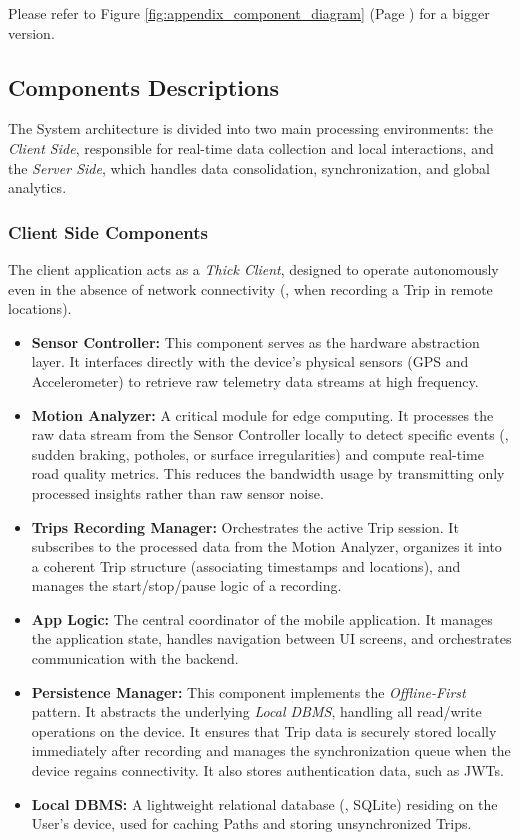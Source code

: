 Please refer to Figure \ref{fig:appendix_component_diagram} (Page \pageref{fig:appendix_component_diagram}) for a bigger version.
\subsection{Components Descriptions}
The System architecture is divided into two main processing environments: the \emph{Client Side}, responsible for real-time data collection and local interactions, and the \emph{Server Side}, which handles data consolidation, synchronization, and global analytics.

\subsubsection*{Client Side Components}
The client application acts as a \emph{Thick Client}, designed to operate autonomously even in the absence of network connectivity (\eg, when recording a Trip in remote locations).
\begin{itemize}
    \item \textbf{Sensor Controller:} This component serves as the hardware abstraction layer. It interfaces directly with the device's physical sensors (GPS and Accelerometer) to retrieve raw telemetry data streams at high frequency.
    
    \item \textbf{Motion Analyzer:} A critical module for edge computing. It processes the raw data stream from the Sensor Controller locally to detect specific events (\eg, sudden braking, potholes, or surface irregularities) and compute real-time road quality metrics. This reduces the bandwidth usage by transmitting only processed insights rather than raw sensor noise.
    
    \item \textbf{Trips Recording Manager:} Orchestrates the active Trip session. It subscribes to the processed data from the Motion Analyzer, organizes it into a coherent Trip structure (associating timestamps and locations), and manages the start/stop/pause logic of a recording.
    
    \item \textbf{App Logic:} The central coordinator of the mobile application. It manages the application state, handles navigation between UI screens, and orchestrates communication with the backend.
    
    \item \textbf{Persistence Manager:} This component implements the \emph{Offline-First} pattern. It abstracts the underlying \emph{Local DBMS}, handling all read/write operations on the device. It ensures that Trip data is securely stored locally immediately after recording and manages the synchronization queue when the device regains connectivity. It also stores authentication data, such as JWTs.
    
    \item \textbf{Local DBMS:} A lightweight relational database (\eg, SQLite) residing on the User's device, used for caching Paths and storing unsynchronized Trips.
\end{itemize}

